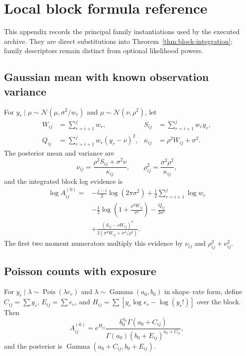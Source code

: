 \section{Local block formula reference}
\label{app:family-formulas}

This appendix records the principal family instantiations used by the executed archive. They are direct substitutions into Theorem~\ref{thm:block-integration}; family descriptors remain distinct from optional likelihood powers.

\subsection{Gaussian mean with known observation variance}
For $y_r\mid\mu\sim\mathcal N(\mu,\sigma^2/w_r)$ and $\mu\sim\mathcal N(\nu,\rho^2)$, let
\begin{align*}
W_{ij}&=\sum_{r=i+1}^{j}w_r,
& S_{ij}&=\sum_{r=i+1}^{j}w_ry_r,\\
Q_{ij}&=\sum_{r=i+1}^{j}w_r(y_r-\nu)^2,
& \kappa_{ij}&=\rho^2W_{ij}+\sigma^2.
\end{align*}
The posterior mean and variance are
\[
\nu_{ij}=\frac{\rho^2S_{ij}+\sigma^2\nu}{\kappa_{ij}},
\qquad
\rho_{ij}^2=\frac{\sigma^2\rho^2}{\kappa_{ij}},
\]
and the integrated block log evidence is
\begin{align}
\log A^{(0)}_{ij}
={}&-\frac{j-i}{2}\log(2\pi\sigma^2)
+\frac12\sum_{r=i+1}^{j}\log w_r\nonumber\\
&-\frac12\log\!\left(1+\frac{\rho^2W_{ij}}{\sigma^2}\right)
-\frac{Q_{ij}}{2\sigma^2}\nonumber\\
&+\frac{(S_{ij}-\nu W_{ij})^2}
{2(\sigma^2W_{ij}+\sigma^4/\rho^2)}.
\label{eq:gaussian-block-app}
\end{align}
The first two moment numerators multiply this evidence by $\nu_{ij}$ and $\rho_{ij}^2+\nu_{ij}^2$.

\subsection{Poisson counts with exposure}
For $y_r\mid\lambda\sim\operatorname{Pois}(\lambda e_r)$ and $\lambda\sim\operatorname{Gamma}(a_0,b_0)$ in shape--rate form, define $C_{ij}=\sum y_r$, $E_{ij}=\sum e_r$, and
$H_{ij}=\sum[y_r\log e_r-\log(y_r!)]$ over the block. Then
\begin{equation}
A^{(0)}_{ij}
=e^{H_{ij}}
\frac{b_0^{a_0}\Gamma(a_0+C_{ij})}
{\Gamma(a_0)(b_0+E_{ij})^{a_0+C_{ij}}},
\label{eq:poisson-block-app}
\end{equation}
and the posterior is $\operatorname{Gamma}(a_0+C_{ij},b_0+E_{ij})$.

